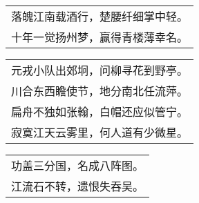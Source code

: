\nopagebreak%
\nopagebreak%
\noindent\begin{minipage}{\linewidth}
  \vskip-3pt\begin{table}[H]
    \centering
    \begin{tabular}{@{}l@{}}
落魄江南载酒行，楚腰纤细掌中轻。\\
十年一觉扬州梦，赢得青楼薄幸名。
    \end{tabular}
  \end{table}
\end{minipage}
\vspace{1cm}


\nopagebreak%
\nopagebreak%
\noindent\begin{minipage}{\linewidth}
  \vskip-3pt\begin{table}[H]
    \centering
    \begin{tabular}{@{}l@{}}
元戎小队出郊坰，问柳寻花到野亭。\\
川合东西瞻使节，地分南北任流萍。\\
扁舟不独如张翰，白帽还应似管宁。\\
寂寞江天云雾里，何人道有少微星。
    \end{tabular}
  \end{table}
\end{minipage}
\vspace{1cm}


\nopagebreak%
\nopagebreak%
\noindent\begin{minipage}{\linewidth}
  \vskip-3pt\begin{table}[H]
    \centering
    \begin{tabular}{@{}l@{}}
功盖三分国，名成八阵图。\\
江流石不转，遗恨失吞吴。
    \end{tabular}
  \end{table}
\end{minipage}
\vspace{1cm}


